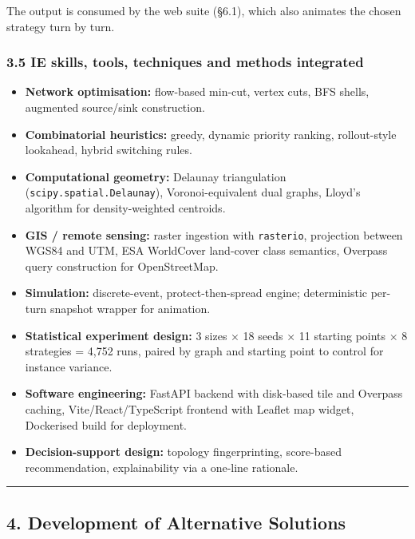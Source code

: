 \documentclass[
  11pt,
]{article}
\providecommand{\tightlist}{%
  \setlength{\itemsep}{0pt}\setlength{\parskip}{0pt}}
\begin{document}
The output is consumed by the web suite (§6.1), which also animates the
chosen strategy turn by turn.

\subsubsection{3.5 IE skills, tools, techniques and methods
integrated}\label{ie-skills-tools-techniques-and-methods-integrated}

\begin{itemize}
\tightlist
\item
  \textbf{Network optimisation:} flow-based min-cut, vertex cuts, BFS
  shells, augmented source/sink construction.
\item
  \textbf{Combinatorial heuristics:} greedy, dynamic priority ranking,
  rollout-style lookahead, hybrid switching rules.
\item
  \textbf{Computational geometry:} Delaunay triangulation
  (\texttt{scipy.spatial.Delaunay}), Voronoi-equivalent dual graphs,
  Lloyd's algorithm for density-weighted centroids.
\item
  \textbf{GIS / remote sensing:} raster ingestion with
  \texttt{rasterio}, projection between WGS84 and UTM, ESA WorldCover
  land-cover class semantics, Overpass query construction for
  OpenStreetMap.
\item
  \textbf{Simulation:} discrete-event, protect-then-spread engine;
  deterministic per-turn snapshot wrapper for animation.
\item
  \textbf{Statistical experiment design:} 3 sizes × 18 seeds × 11
  starting points × 8 strategies = 4,752 runs, paired by graph and
  starting point to control for instance variance.
\item
  \textbf{Software engineering:} FastAPI backend with disk-based tile
  and Overpass caching, Vite/React/TypeScript frontend with Leaflet map
  widget, Dockerised build for deployment.
\item
  \textbf{Decision-support design:} topology fingerprinting, score-based
  recommendation, explainability via a one-line rationale.
\end{itemize}

\begin{center}\rule{0.5\linewidth}{0.5pt}\end{center}

\subsection{4. Development of Alternative
Solutions}\label{development-of-alternative-solutions}
\end{document}
